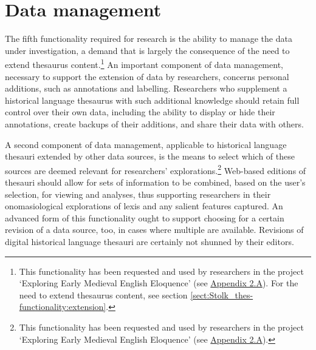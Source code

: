 \section{Data management}
\label{sect:Stolk_thes-functionality:data-management}

The fifth functionality required for research is the ability to manage the data under investigation, a demand that is largely the consequence of the need to extend thesaurus content.\footnote{This functionality has been requested and used by researchers in the project `Exploring Early Medieval English Eloquence' (see \hyperref[Appendix2.A]{Appendix 2.A}). For the need to extend thesaurus content, see section \ref{sect:Stolk_thes-functionality:extension}.} An important component of data management, necessary to support the extension of data by researchers, concerns personal additions, such as annotations and labelling. Researchers who supplement a historical language thesaurus with such additional knowledge should retain full control over their own data, including the ability to display or hide their annotations, create backups of their additions, and share their data with others.


A second component of data management, applicable to historical language thesauri extended by other data sources, is the means to select which of these sources are deemed relevant for researchers' explorations.\footnote{This functionality has been requested and used by researchers in the project `Exploring Early Medieval English Eloquence' (see \hyperref[Appendix2.A]{Appendix 2.A}).} Web-based editions of thesauri should allow for sets of information to be combined, based on the user's selection, for viewing and analyses, thus supporting researchers in their onomasiological explorations of lexis and any salient features captured. An advanced form of this functionality ought to support choosing for a certain revision of a data source, too, in cases where multiple are available. Revisions of digital historical language thesauri are certainly not shunned by their editors.

